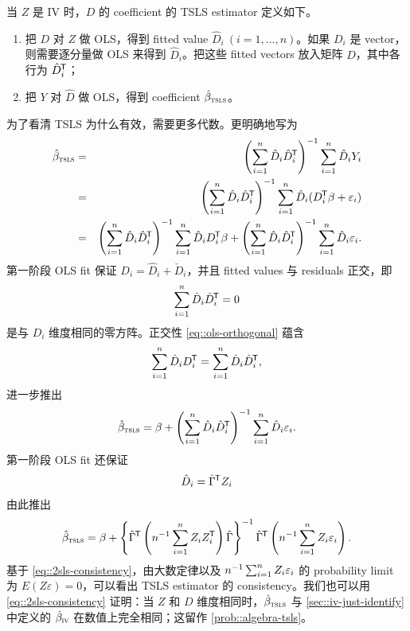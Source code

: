 \begin{definition}
\label{def::2sls}
当 $Z$ 是 IV 时，$D$ 的 coefficient 的 TSLS estimator 定义如下。
\begin{enumerate}
\item
把 $D$ 对 $Z$ 做 OLS，得到 fitted value $\hat{D}_i\ (i=1,\ldots, n)$。如果 $D_i$ 是 vector，则需要逐分量做 OLS 来得到 $\hat{D}_i$。把这些 fitted vectors 放入矩阵 $\hat{D}$，其中各行为 $\hat{D}_i^{\mkern-1.5mu\mathsf{T}} $；
\item
把 $Y$ 对 $\hat{D}$ 做 OLS，得到 coefficient $\hat{\beta}_\textsc{tsls}$。  
\end{enumerate}
\end{definition}
 

为了看清 TSLS 为什么有效，需要更多代数。更明确地写为
\begin{eqnarray} 
\hat{\beta}_\textsc{tsls} &=& \left(  \sum_{i=1}^n \hat{D}_i\hat{D}_i^{\mkern-1.5mu\mathsf{T}} \right) ^{-1} 
\sum_{i=1}^n \hat{D}_i Y_i  \label{eq::2sls-definition} \\
&=& \left(  \sum_{i=1}^n \hat{D}_i\hat{D}_i^{\mkern-1.5mu\mathsf{T}} \right) ^{-1} 
\sum_{i=1}^n \hat{D}_i (D_i ^{\mkern-1.5mu\mathsf{T}} \beta + \varepsilon_i)  \nonumber  \\
&=& \left(  \sum_{i=1}^n \hat{D}_i\hat{D}_i^{\mkern-1.5mu\mathsf{T}} \right) ^{-1} 
\sum_{i=1}^n \hat{D}_i D_i ^{\mkern-1.5mu\mathsf{T}} \beta + \left(  \sum_{i=1}^n \hat{D}_i\hat{D}_i^{\mkern-1.5mu\mathsf{T}} \right) ^{-1} \sum_{i=1}^n \hat{D}_i  \varepsilon_i .   \nonumber 
\end{eqnarray}  
第一阶段 OLS fit 保证 $D_i  = \hat{D}_i + \check D_i$，并且 fitted values 与 residuals 正交，即
\begin{equation} \label{eq::ols-orthogonal}
\sum_{i=1}^n \hat{D}_i  \check D_i^{\mkern-1.5mu\mathsf{T}} = 0
\end{equation}
是与 $D_i$ 维度相同的零方阵。正交性 \cref{eq::ols-orthogonal} 蕴含
$$
\sum_{i=1}^n \hat{D}_i D_i ^{\mkern-1.5mu\mathsf{T}} = \sum_{i=1}^n \hat{D}_i\hat{D}_i^{\mkern-1.5mu\mathsf{T}},
$$ 
进一步推出
\begin{eqnarray}
\label{eq::2sls-ols}
\hat{\beta}_\textsc{tsls} = \beta + \left(  \sum_{i=1}^n \hat{D}_i\hat{D}_i^{\mkern-1.5mu\mathsf{T}} \right) ^{-1} \sum_{i=1}^n \hat{D}_i  \varepsilon_i.
\end{eqnarray}
第一阶段 OLS fit 还保证
\begin{equation}
\label{eq::ols-donz}
\hat{D}_i = \hat{\Gamma}^{\mkern-1.5mu\mathsf{T}}  Z_i 
\end{equation}
由此推出
\begin{eqnarray}
\label{eq::2sls-consistency}
\hat{\beta}_\textsc{tsls} = \beta + \left\{  \hat{\Gamma}^{\mkern-1.5mu\mathsf{T}}  \left(  n^{-1}  \sum_{i=1}^n Z_i Z_i^{\mkern-1.5mu\mathsf{T}}  \right) \hat{\Gamma}  \right\}  ^{-1}  
\hat{\Gamma}^{\mkern-1.5mu\mathsf{T}}  \left( n^{-1} \sum_{i=1}^n Z_i  \varepsilon_i \right) . 
\end{eqnarray}
基于 \cref{eq::2sls-consistency}，由大数定律以及 $n^{-1} \sum_{i=1}^n Z_i  \varepsilon_i $ 的 probability limit 为 $E(Z\varepsilon) = 0$，可以看出 TSLS estimator 的 consistency。我们也可以用 \cref{eq::2sls-consistency} 证明：当 $Z$ 和 $D$ 维度相同时，$\hat{\beta}_\textsc{tsls} $ 与 \cref{sec::iv-just-identify} 中定义的 $\hat{\beta}_\textsc{iv} $ 在数值上完全相同；这留作 \cref{prob::algebra-tsls}。 




